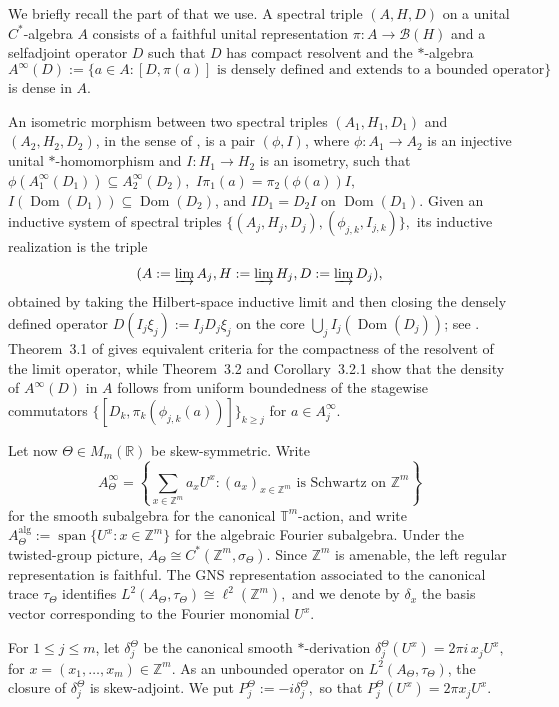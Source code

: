\documentclass[11pt]{amsart}
\theoremstyle{definition}
\theoremstyle{remark}
\newcommand{\T}{\mathbb{T}}
\newcommand{\Z}{\mathbb{Z}}
\newcommand{\R}{\mathbb{R}}
\begin{document}
We briefly recall the part of \cite{FloricelGhorbanpour} that we use. A
spectral triple $(A,H,D)$ on a unital $C^*$-algebra $A$ consists of a
faithful unital representation $\pi\colon A\to\mathcal B(H)$ and a
selfadjoint operator $D$ such that $D$ has compact resolvent and the
$*$-algebra \[A^\infty (D)
:=\{a\in A : [D,\pi(a)] \text{ is densely defined and extends to a bounded operator}\}\]
is dense in $A$.

An isometric morphism between two spectral triples $(A_1,H_1,D_1)$ and $(A_2,H_2,D_2)$, in the sense of
\cite[Definition~2.1]{FloricelGhorbanpour}, is a pair $(\phi,I)$, where
$\phi\colon A_1\to A_2$ is an injective unital $*$-homomorphism and
$I\colon H_1\to H_2$ is an isometry, such that $\phi(A_1^\infty (D_1))\subseteq A_2^\infty (D_2),$ 
$I\pi_1(a)=\pi_2(\phi(a))I,$ 
$I(\operatorname{Dom}(D_1))\subseteq \operatorname{Dom}(D_2)$, and $ID_1=D_2I$ on $\operatorname{Dom}(D_1)$. Given an inductive
system of spectral triples $\bigl\{(A_j,H_j,D_j),(\phi_{j,k},I_{j,k})\bigr\},$ 
 its inductive realization is the triple
\[ (A:=\varinjlim A_j,H:=\varinjlim H_j,D:=\varinjlim D_j),\] 
obtained by taking the Hilbert-space inductive limit and then closing the densely
defined operator $D(I_j\xi_j):=I_jD_j\xi_j$
on the core $\bigcup_j I_j(\operatorname{Dom}(D_j))$; see
\cite[Definition~2.3]{FloricelGhorbanpour}. Theorem~3.1 of \cite{FloricelGhorbanpour} gives equivalent
criteria for the compactness of the resolvent of the limit operator,  while
Theorem~3.2 and Corollary~3.2.1 show that the density of $A^\infty(D)$ in $A$ follows from uniform boundedness of the stagewise commutators $\bigl\{[D_k,\pi_k(\phi_{j,k}(a))]\bigr\}_{k\geq j}$
for $a\in A_j^\infty$.

Let now $\Theta\in M_m(\R)$ be skew-symmetric. Write
\[
A_\Theta^\infty
=
\left\{
\sum_{x\in\Z^m} a_xU^x:
(a_x)_{x\in\Z^m}\text{ is Schwartz on }\Z^m
\right\}
\]
for the smooth subalgebra for the canonical $\T^m$-action, and write $A_\Theta^{\mathrm{alg}}:=\operatorname{span}\{U^x:x\in\Z^m\}$
for the algebraic Fourier subalgebra. Under the twisted-group picture,
$A_\Theta\cong C^*(\Z^m,\sigma_\Theta)$. Since $\Z^m$ is amenable, the
left regular representation is faithful. The GNS representation associated to
the canonical trace $\tau_\Theta$ identifies $L^2(A_\Theta,\tau_\Theta)\cong \ell^2(\Z^m),$
and we denote by $\delta_x$ the basis vector corresponding to the Fourier
monomial $U^x$.

For $1\leq j\leq m$, let $\delta_j^\Theta$ be the canonical smooth
$*$-derivation $\delta_j^\Theta(U^x)=2\pi i\,x_jU^x,$ for
$x=(x_1,\ldots,x_m)\in\Z^m.$
As an unbounded operator on $L^2(A_\Theta,\tau_\Theta)$, the closure of
$\delta_j^\Theta$ is skew-adjoint.  We put $P_j^\Theta:=-i\delta_j^\Theta,$
so that $
P_j^\Theta(U^x)=2\pi x_jU^x.$
\end{document}

